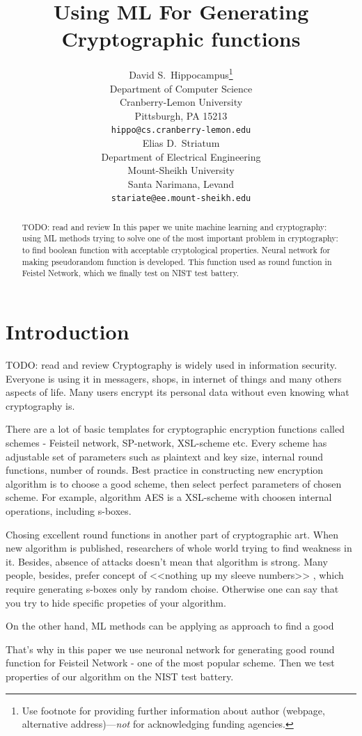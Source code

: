 \documentclass{article}
\title{Using ML For Generating Cryptographic functions}
\author{
  David S.~Hippocampus\thanks{Use footnote for providing further
    information about author (webpage, alternative
    address)---\emph{not} for acknowledging funding agencies.} \\
  Department of Computer Science\\
  Cranberry-Lemon University\\
  Pittsburgh, PA 15213 \\
  \texttt{hippo@cs.cranberry-lemon.edu} \\
   \And
 Elias D.~Striatum \\
  Department of Electrical Engineering\\
  Mount-Sheikh University\\
  Santa Narimana, Levand \\
  \texttt{stariate@ee.mount-sheikh.edu} \\
}
\begin{document}
\maketitle

\begin{abstract}
TODO: read and review
In this paper we unite machine learning 
and cryptography: using ML methods 
trying to solve one of the 
most important problem
in cryptography: to find boolean
function with acceptable cryptological
properties. Neural network for making pseudorandom
function is developed. This function 
used as round function in Feistel Network, which 
 we finally test on NIST test battery.
\end{abstract}




\section{Introduction}
TODO: read and review
Cryptography is widely used in
information security. 
Everyone is using it in messagers, shops, 
in internet of things and many others 
aspects of life. Many users
encrypt its personal data without even 
knowing what cryptography is. 

There are a lot of basic templates
for cryptographic encryption
functions called schemes - Feisteil network, SP-network, XSL-scheme etc. 
Every scheme has adjustable
set of parameters such as 
plaintext and key size, internal
round functions, number of rounds. 
Best practice in constructing new encryption
algorithm is to choose a good scheme, 
then select perfect parameters of chosen scheme.
For example, algorithm AES is a XSL-scheme 
with choosen internal operations, including s-boxes.

Chosing excellent round functions in another part 
of cryptographic art.
When new algorithm is published,
researchers of whole world trying to find 
 weakness in it.
 Besides, absence of attacks 
 doesn't mean that algorithm is strong. 
 Many people, besides,  prefer  concept of 
 <<nothing up my sleeve numbers>> \cite{NMSN}, 
 which require generating s-boxes only 
 by random choise. Otherwise one can say that you
 try to hide specific propeties of your algorithm.
 
 
 On the other hand, ML methods can be applying as
 approach to find a good 
 
 That's why in this paper we use neuronal network for generating good round function 
 for Feisteil Network - one of the most popular scheme.
 Then we test properties of our algorithm on the NIST test battery.
\end{document}
